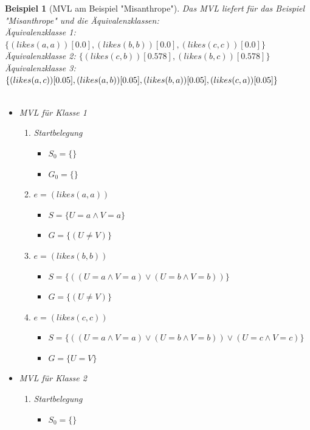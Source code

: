 \documentclass[draft]{scrreprt}
\newtheorem{Bsp}{Beispiel}[section]
\begin{document}
\begin{Bsp}[MVL am Beispiel "{}Misanthrope"{}]
	Das MVL liefert für das Beispiel "{}Misanthrope"{} und die Äquivalenzklassen:\\
Äquivalenzklasse 1: $ \{(likes(a,a))[0.0], (likes(b,b))[0.0], (likes(c,c))[0.0]\} $\\
Äquivalenzklasse 2: $ \{(likes(c,b))[0.578], (likes(b,c))[0.578]\} $\\
Äquivalenzklasse 3: $ \{(likes(a,c))[0.05], (likes(a,b))[0.05], (likes(b,a))[0.05],\\ (likes(c,a))[0.05]\} $\\
\\
\noindent
\begin{itemize}
	\item MVL für Klasse 1
	\begin{enumerate}
		\item Startbelegung
		\begin{itemize}
			\item $ S_0 = \{\}$ 
			\item $ G_0 = \{\} $
		\end{itemize}
		\item $ e = (likes(a,a)) $
		\begin{itemize}
			\item $ S = \{U = a \land V = a\}$ 
			\item $ G = \{(U \neq V)\} $
		\end{itemize}
		\item $ e = (likes(b,b)) $
		\begin{itemize}
			\item $ S = \{((U = a \land V = a) \lor (U = b \land V = b))\}$ 
			\item $ G = \{(U \neq V)\} $
		\end{itemize}
		\item $ e = (likes(c,c)) $
		\begin{itemize}
		    \item $ S = \{((U = a \land V = a) \lor (U = b \land V = b)) \lor (U = c \land V = c)\}$ 
			\item $ G = \{U = V\} $
		\end{itemize}	
	\end{enumerate}
	\item MVL für Klasse 2
	\begin{enumerate}
		\item Startbelegung
		\begin{itemize}
			\item $ S_0 = \{\}$ 

\end{itemize}
\end{enumerate}
\end{itemize}
\end{Bsp}
\end{document}
